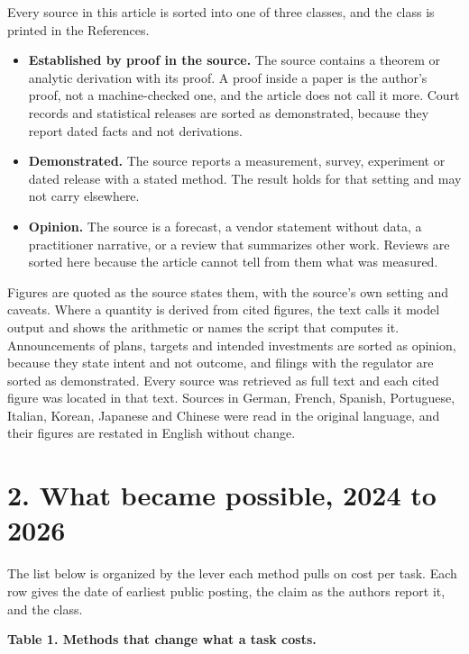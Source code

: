 \documentclass[10pt,letterpaper]{article}
\providecommand{\tightlist}{\setlength{\itemsep}{1pt}\setlength{\parskip}{0pt}}
\begin{document}
Every source in this article is sorted into one of three classes, and
the class is printed in the References.

\begin{itemize}
\tightlist
\item
  \textbf{Established by proof in the source.} The source contains a
  theorem or analytic derivation with its proof. A proof inside a paper
  is the author's proof, not a machine-checked one, and the article does
  not call it more. Court records and statistical releases are sorted as
  demonstrated, because they report dated facts and not derivations.
\item
  \textbf{Demonstrated.} The source reports a measurement, survey,
  experiment or dated release with a stated method. The result holds for
  that setting and may not carry elsewhere.
\item
  \textbf{Opinion.} The source is a forecast, a vendor statement without
  data, a practitioner narrative, or a review that summarizes other
  work. Reviews are sorted here because the article cannot tell from
  them what was measured.
\end{itemize}

Figures are quoted as the source states them, with the source's own
setting and caveats. Where a quantity is derived from cited figures, the
text calls it model output and shows the arithmetic or names the script
that computes it. Announcements of plans, targets and intended
investments are sorted as opinion, because they state intent and not
outcome, and filings with the regulator are sorted as demonstrated.
Every source was retrieved as full text and each cited figure was
located in that text. Sources in German, French, Spanish, Portuguese,
Italian, Korean, Japanese and Chinese were read in the original
language, and their figures are restated in English without change.

\section{2. What became possible, 2024 to
2026}\label{what-became-possible-2024-to-2026}

The list below is organized by the lever each method pulls on cost per
task. Each row gives the date of earliest public posting, the claim as
the authors report it, and the class.

\textbf{Table 1. Methods that change what a task costs.}
\end{document}
